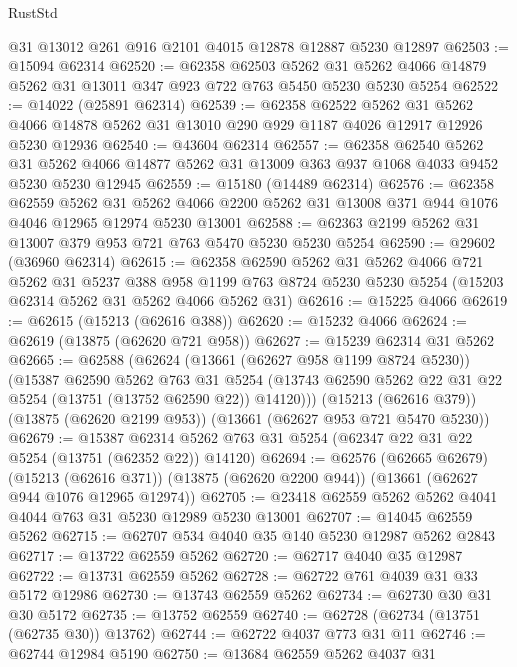 \begin{lexlean}{RustStd}
\begin{coremodule}
    @31
    @13012
    @261
    @916
    @2101
    @4015
    @12878
    @12887
    @5230
    @12897
@62503 := @15094 @62314
@62520 := @62358
    @62503
    @5262
    @31
    @5262
    @4066
    @14879
    @5262
    @31
    @13011
    @347
    @923
    @722
    @763
    @5450
    @5230
    @5230
    @5254
@62522 := @14022 (@25891 @62314)
@62539 := @62358
    @62522
    @5262
    @31
    @5262
    @4066
    @14878
    @5262
    @31
    @13010
    @290
    @929
    @1187
    @4026
    @12917
    @12926
    @5230
    @12936
@62540 := @43604 @62314
@62557 := @62358
    @62540
    @5262
    @31
    @5262
    @4066
    @14877
    @5262
    @31
    @13009
    @363
    @937
    @1068
    @4033
    @9452
    @5230
    @5230
    @12945
@62559 := @15180 (@14489 @62314)
@62576 := @62358
    @62559
    @5262
    @31
    @5262
    @4066
    @2200
    @5262
    @31
    @13008
    @371
    @944
    @1076
    @4046
    @12965
    @12974
    @5230
    @13001
@62588 := @62363 @2199 @5262 @31 @13007 @379 @953 @721 @763 @5470 @5230 @5230 @5254
@62590 := @29602 (@36960 @62314)
@62615 := @62358
    @62590
    @5262
    @31
    @5262
    @4066
    @721
    @5262
    @31
    @5237
    @388
    @958
    @1199
    @763
    @8724
    @5230
    @5230
    @5254
    (@15203 @62314 @5262 @31 @5262 @4066 @5262 @31)
@62616 := @15225 @4066
@62619 := @62615 (@15213 (@62616 @388))
@62620 := @15232 @4066
@62624 := @62619 (@13875 (@62620 @721 @958))
@62627 := @15239 @62314 @31 @5262
@62665 := @62588
    (@62624
      (@13661 (@62627 @958 @1199 @8724 @5230))
      (@15387
        @62590
        @5262
        @763
        @31
        @5254
        (@13743 @62590 @5262 @22 @31 @22 @5254 (@13751 (@13752 @62590 @22)) @14120)))
    (@15213 (@62616 @379))
    (@13875 (@62620 @2199 @953))
    (@13661 (@62627 @953 @721 @5470 @5230))
@62679 := @15387 @62314 @5262 @763 @31 @5254 (@62347 @22 @31 @22 @5254 (@13751 (@62352 @22)) @14120)
@62694 := @62576
    (@62665 @62679)
    (@15213 (@62616 @371))
    (@13875 (@62620 @2200 @944))
    (@13661 (@62627 @944 @1076 @12965 @12974))
@62705 := @23418 @62559 @5262 @5262 @4041 @4044 @763 @31 @5230 @12989 @5230 @13001
@62707 := @14045 @62559 @5262
@62715 := @62707 @534 @4040 @35 @140 @5230 @12987 @5262 @2843
@62717 := @13722 @62559 @5262
@62720 := @62717 @4040 @35 @12987
@62722 := @13731 @62559 @5262
@62728 := @62722 @761 @4039 @31 @33 @5172 @12986
@62730 := @13743 @62559 @5262
@62734 := @62730 @30 @31 @30 @5172
@62735 := @13752 @62559
@62740 := @62728 (@62734 (@13751 (@62735 @30)) @13762)
@62744 := @62722 @4037 @773 @31 @11
@62746 := @62744 @12984 @5190
@62750 := @13684 @62559 @5262 @4037 @31

\end{coremodule}
\end{lexlean}
